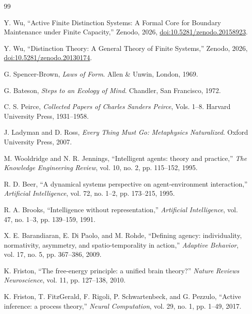 \documentclass[10pt,a4paper,twocolumn,aps,prl]{revtex4-2}
\begin{document}
\begin{thebibliography}{99}

 Y. Wu, ``Active Finite Distinction Systems: A Formal Core for Boundary Maintenance under Finite Capacity,'' Zenodo, 2026, \href{https://doi.org/10.5281/zenodo.20158923}{doi:10.5281/zenodo.20158923}.

 Y. Wu, ``Distinction Theory: A General Theory of Finite Systems,'' Zenodo, 2026, \href{https://doi.org/10.5281/zenodo.20130174}{doi:10.5281/zenodo.20130174}.

G. Spencer-Brown, \emph{Laws of Form}. Allen \& Unwin, London, 1969.

G. Bateson, \emph{Steps to an Ecology of Mind}. Chandler, San Francisco, 1972.

C. S. Peirce, \emph{Collected Papers of Charles Sanders Peirce}, Vols. 1--8. Harvard University Press, 1931--1958.

J. Ladyman and D. Ross, \emph{Every Thing Must Go: Metaphysics Naturalized}. Oxford University Press, 2007.

M. Wooldridge and N. R. Jennings, ``Intelligent agents: theory and practice,'' \emph{The Knowledge Engineering Review}, vol. 10, no. 2, pp. 115--152, 1995.

R. D. Beer, ``A dynamical systems perspective on agent-environment interaction,'' \emph{Artificial Intelligence}, vol. 72, no. 1--2, pp. 173--215, 1995.

R. A. Brooks, ``Intelligence without representation,'' \emph{Artificial Intelligence}, vol. 47, no. 1--3, pp. 139--159, 1991.

X. E. Barandiaran, E. Di Paolo, and M. Rohde, ``Defining agency: individuality, normativity, asymmetry, and spatio-temporality in action,'' \emph{Adaptive Behavior}, vol. 17, no. 5, pp. 367--386, 2009.

K. Friston, ``The free-energy principle: a unified brain theory?'' \emph{Nature Reviews Neuroscience}, vol. 11, pp. 127--138, 2010.

K. Friston, T. FitzGerald, F. Rigoli, P. Schwartenbeck, and G. Pezzulo, ``Active inference: a process theory,'' \emph{Neural Computation}, vol. 29, no. 1, pp. 1--49, 2017.


\end{thebibliography}
\end{document}

